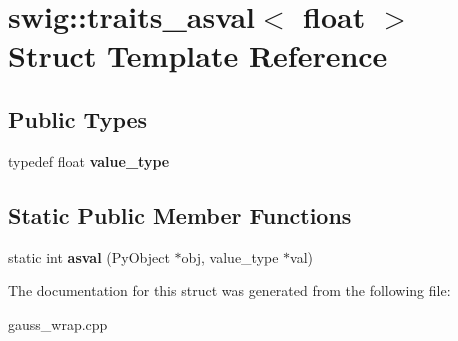 \hypertarget{structswig_1_1traits__asval_3_01float_01_4}{\section{swig\-:\-:traits\-\_\-asval$<$ float $>$ Struct Template Reference}
\label{structswig_1_1traits__asval_3_01float_01_4}
}
\subsection*{Public Types}
\begin{DoxyCompactItemize}
\item 
\hypertarget{structswig_1_1traits__asval_3_01float_01_4_a5ab303d1fdac865c64d2764902cb848d}{typedef float {\bfseries value\-\_\-type}}\label{structswig_1_1traits__asval_3_01float_01_4_a5ab303d1fdac865c64d2764902cb848d}

\end{DoxyCompactItemize}
\subsection*{Static Public Member Functions}
\begin{DoxyCompactItemize}
\item 
\hypertarget{structswig_1_1traits__asval_3_01float_01_4_a0edcefd0586a0edaca5f88f160a5152c}{static int {\bfseries asval} (Py\-Object $\ast$obj, value\-\_\-type $\ast$val)}\label{structswig_1_1traits__asval_3_01float_01_4_a0edcefd0586a0edaca5f88f160a5152c}

\end{DoxyCompactItemize}


The documentation for this struct was generated from the following file\-:\begin{DoxyCompactItemize}
\item 
gauss\-\_\-wrap.\-cpp\end{DoxyCompactItemize}
